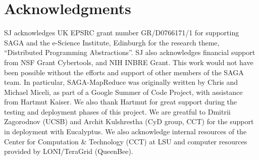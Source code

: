 \documentclass[conference,final]{IEEEtran}
\newcommand{\sagamapreduce }{SAGA-MapReduce }
\begin{document}





\section{Acknowledgments}

SJ acknowledges UK EPSRC grant number GR/D0766171/1 for supporting
SAGA and the e-Science Institute, Edinburgh for the research theme,
``Distributed Programming Abstractions''.  SJ also acknowledges
financial support from NSF Grant Cybertools, and NIH INBRE Grant. This
work would not have been possible without the efforts and support of
other members of the SAGA team.  In particular, \sagamapreduce was
originally written by Chris and Michael Miceli, as part of a Google
Summer of Code Project, with assistance from Hartmut Kaiser. We also
thank Hartmut for great support during the testing and deployment
phases of this project. We are greatful to Dmitrii Zagorodnov (UCSB)
and Archit Kulshrestha (CyD group, CCT) for the support in deployment
with Eucalyptus.  We also acknowledge internal resources of the Center
for Computation \& Technology (CCT) at LSU and computer resources
provided by LONI/TeraGrid (QueenBee).  

\end{document}

